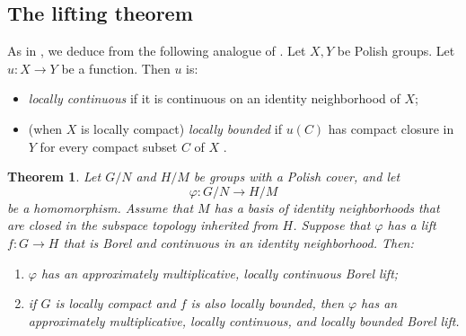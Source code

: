 \documentclass[12pt]{amsart}
\newtheorem{theorem}{Theorem}[section]
\theoremstyle{definition}
\begin{document}
\subsection{The lifting theorem}

As in \cite[Section~5]{lupini_looking_2024}, we deduce from %
 the following analogue of \cite[%
Proposition~5.3]{lupini_looking_2024}. Let $X,Y$ be Polish groups. Let $%
u:X\rightarrow Y$ be a function. Then $u$ is:

\begin{itemize}
\item \emph{locally continuous} if it is continuous on an identity
neighborhood of $X$;

\item (when $X$ is locally compact) \emph{locally bounded} if $u(C)$ has
compact closure in $Y$ for every compact subset $C$ of $X$ \cite%
{kehlet_cross_1984}.
\end{itemize}

\begin{theorem}
\label{Theorem:approximately-multiplicative-lift} Let $G/N$ and $H/M$ be
groups with a Polish cover, and let 
\begin{equation*}
\varphi :G/N\longrightarrow H/M
\end{equation*}%
be a homomorphism. Assume that $M$ has a basis of identity neighborhoods
that are closed in the subspace topology inherited from $H$. Suppose that $%
\varphi $ has a lift $f:G\rightarrow H$ that is Borel and continuous in an
identity neighborhood. Then:

\begin{enumerate}
\item $\varphi $ has an approximately multiplicative, locally continuous
Borel lift;

\item if $G$ is locally compact and $f$ is also locally bounded, then $%
\varphi $ has an approximately multiplicative, locally continuous, and
locally bounded Borel lift.
\end{enumerate}
\end{theorem}
\end{document}
